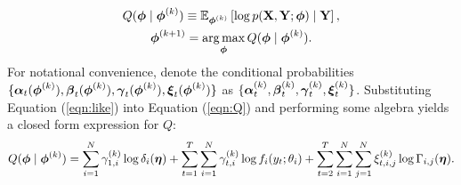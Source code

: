 \begin{gather}
    Q(\boldsymbol{\phi} \mid \boldsymbol{\phi}^{(k)}) \equiv \mathbb{E}_{\boldsymbol{\phi}^{(k)}}\left[\log p(\mathbf{X},\mathbf{Y};\boldsymbol{\phi}) \mid \mathbf{Y} \right] \label{eqn:Q}, \\
    \boldsymbol{\phi}^{(k+1)} = \operatorname*{arg\,max}_{\boldsymbol{\phi}} Q(\boldsymbol{\phi} \mid \boldsymbol{\phi}^{(k)}). \label{eqn:BW_update}
\end{gather}
%
For notational convenience, denote the conditional probabilities $\{\boldsymbol{\alpha}_t(\boldsymbol{\phi}^{(k)}), \boldsymbol{\beta}_t(\boldsymbol{\phi}^{(k)}), \boldsymbol{\gamma}_t(\boldsymbol{\phi}^{(k)}), \boldsymbol{\xi}_t(\boldsymbol{\phi}^{(k)})\}$ as $\{\boldsymbol{\alpha}_t^{(k)},\boldsymbol{\beta}_t^{(k)},\boldsymbol{\gamma}_t^{(k)},\boldsymbol{\xi}_t^{(k)}\}$. 
Substituting Equation (\ref{eqn:like}) into Equation (\ref{eqn:Q}) and performing some algebra yields a closed form expression for $Q$: %
\begin{equation}
    Q(\bfphi \mid \bfphi^{(k)}) %
    = \sum_{i=1}^N \gamma_{1,i}^{(k)} \log \delta_{i}(\bfeta) + \sum_{t = 1}^T \sum_{i=1}^N \gamma_{t,i}^{(k)} \log f_{i}(y_t;\theta_{i}) + \sum_{t=2}^{T} \sum_{i=1}^N \sum_{j=1}^N \xi_{t,i,j}^{(k)} \log \Gamma_{i,j}(\bfeta).
    \label{eqn:Q_sum}
\end{equation}
%
